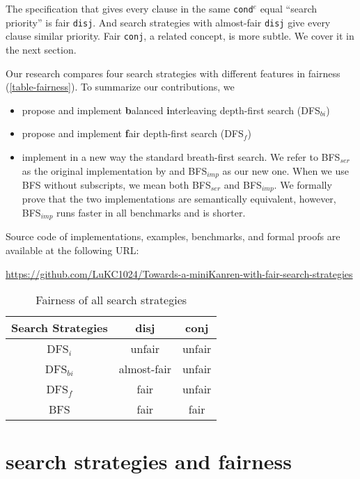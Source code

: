 \documentclass[acmlarge]{acmart}
\newcommand{\conde}{\texttt{cond$^e$}}
\newcommand{\conj}{\texttt{conj}}
\newcommand{\disj}{\texttt{disj}}
\newcommand{\DFSi }[0]{DFS$_{i}$}
\newcommand{\DFSf }[0]{DFS$_{f}$}
\newcommand{\DFSbi}[0]{DFS$_{bi}$}
\newcommand{\BFS}[0]{BFS}
\newcommand{\BFSser}[0]{BFS$_{ser}$}
\newcommand{\BFSimp}[0]{BFS$_{imp}$}
\begin{document}
The specification that gives every clause in the same \conde{} equal 
``search priority'' is fair \disj{}. And search strategies with 
almost-fair \disj{} give every clause similar priority. 
Fair \conj{}, a related concept, is more subtle. We cover it in the next 
section.

Our research compares four search strategies with different features in fairness
(\autoref{table-fairness}). To summarize our contributions, we
\begin{itemize}
	\item propose and implement \textbf{b}alanced \textbf{i}nterleaving 
	depth-first search (\DFSbi{})
	\item propose and implement \textbf{f}air depth-first search (\DFSf{})
	\item implement in a new way the standard breath-first search. 
	We refer to \BFSser{} as the original implementation by 
	\citet{seres1999algebra} and \BFSimp{} as our new 
	one. When we use BFS without subscripts, we mean both \BFSser{} and 
	\BFSimp{}.
	We formally prove that the two implementations are 
	semantically equivalent, however, \BFSimp{} runs faster in all benchmarks 
	and 
	is shorter.
\end{itemize}

Source code of implementations, examples, benchmarks, and formal proofs are 
available at the 
following URL:

\begin{center}
\url{https://github.com/LuKC1024/Towards-a-miniKanren-with-fair-search-strategies}
\end{center}

\begin{table}[h]
	\begin{tabular}{|c|c|c|}
		\hline 
		Search Strategies & disj & conj \\ 
		\hline 
		\DFSi & unfair & unfair \\ 
		\hline 
		\DFSbi & almost-fair & unfair \\ 
		\hline 
		\DFSf & fair & unfair \\ 
		\hline 
		\BFS & fair & fair \\ 
		\hline 
	\end{tabular} 
	\caption{Fairness of all search strategies}
	\label{table-fairness}
\end{table}

\section{search strategies and fairness}
\end{document}
